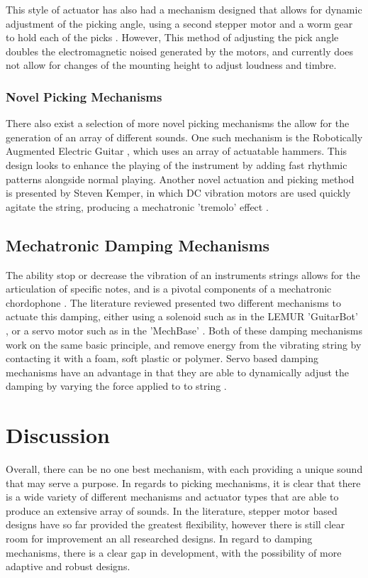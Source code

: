 \documentclass[a4paper,11pt]{article}
\begin{document}
This style of actuator has also had a mechanism designed that allows for dynamic adjustment of the picking angle, using a second stepper motor and a worm gear to hold each of the picks \cite{Carnegie2020}. However, This method of adjusting the pick angle doubles the electromagnetic noised generated by the motors, and currently does not allow for changes of the mounting height to adjust loudness and timbre. 

\subsubsection{Novel Picking Mechanisms}

There also exist a selection of more novel picking mechanisms the allow for the generation of an array of different sounds. One such mechanism is the Robotically Augmented Electric Guitar \cite{Ogata2017}, which uses an array of actuatable hammers. This design looks to enhance the playing of the instrument by adding fast rhythmic patterns alongside normal playing. Another novel actuation and picking method is presented by Steven Kemper, in which DC vibration motors are used quickly agitate the string, producing a mechatronic 'tremolo' effect \cite{Kemper2020}.


\subsection{Mechatronic Damping Mechanisms}

The ability stop or decrease the vibration of an instruments strings allows for the articulation of specific notes, and is a pivotal components of a mechatronic chordophone \cite{YepezPlacencia2020}. The literature reviewed presented two different mechanisms to actuate this damping, either using a solenoid such as in the LEMUR 'GuitarBot' \cite{Singer2003}, or a servo motor such as in the 'MechBase' \cite{McVay2015}. 
Both of these damping mechanisms work on the same basic principle, and remove energy from the vibrating string by contacting it with a foam, soft plastic or polymer. Servo based damping mechanisms have an advantage in that they are able to dynamically adjust the damping by varying the force applied to to string \cite{Carnegie2020}.


\section{Discussion}

Overall, there can be no one best mechanism, with each providing a unique sound that may serve a purpose. In regards to picking mechanisms, it is clear that there is a wide variety of different mechanisms and actuator types that are able to produce an extensive array of sounds. In the literature, stepper motor based designs have so far provided the greatest flexibility, however there is still clear room for improvement an all researched designs. In regard to damping mechanisms, there is a clear gap in development, with the possibility of more adaptive and robust designs. 


\newpage


\end{document}

